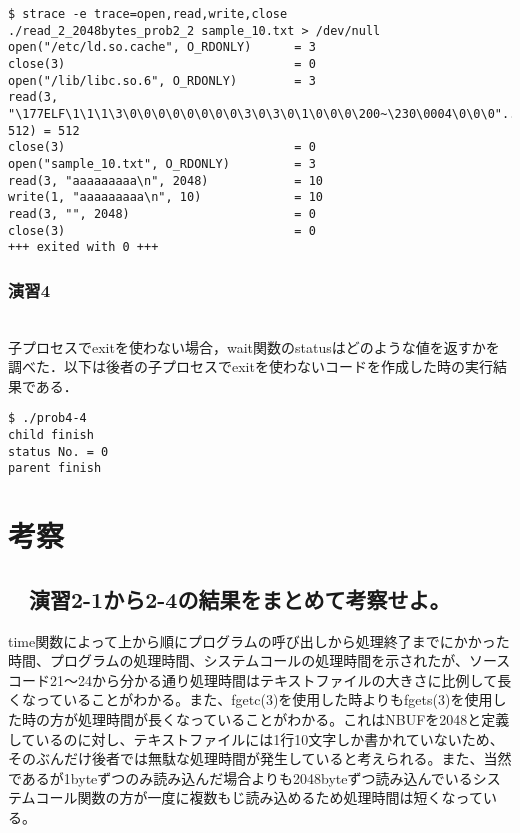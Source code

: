 \documentclass[a4paper,12pt]{jsarticle}
\begin{document}
\begin{lstlisting}[basicstyle=\footnotesize, caption={strace\_read\_2\_2048byte\_prob2\_2}, label=strace2048]
$ strace -e trace=open,read,write,close 
./read_2_2048bytes_prob2_2 sample_10.txt > /dev/null 
open("/etc/ld.so.cache", O_RDONLY)      = 3
close(3)                                = 0
open("/lib/libc.so.6", O_RDONLY)        = 3
read(3, "\177ELF\1\1\1\3\0\0\0\0\0\0\0\0\3\0\3\0\1\0\0\0\200~\230\0004\0\0\0"..., 512) = 512
close(3)                                = 0
open("sample_10.txt", O_RDONLY)         = 3
read(3, "aaaaaaaaa\n", 2048)            = 10
write(1, "aaaaaaaaa\n", 10)             = 10
read(3, "", 2048)                       = 0
close(3)                                = 0
+++ exited with 0 +++
\end{lstlisting}


\subsubsection{演習4}
\\
子プロセスでexitを使わない場合，wait関数のstatusはどのような値を返すかを調べた．以下は後者の子プロセスでexitを使わないコードを作成した時の実行結果である．
\begin{lstlisting}[basicstyle=\footnotesize, caption={prob4-4}, label=waitparent]
$ ./prob4-4
child finish
status No. = 0
parent finish
\end{lstlisting}

\section{考察}
\subsection*{　演習2-1から2-4の結果をまとめて考察せよ。}
time関数によって上から順にプログラムの呼び出しから処理終了までにかかった時間、プログラムの処理時間、システムコールの処理時間を示されたが、ソースコード21〜24から分かる通り処理時間はテキストファイルの大きさに比例して長くなっていることがわかる。また、fgetc(3)を使用した時よりもfgets(3)を使用した時の方が処理時間が長くなっていることがわかる。これはNBUFを2048と定義しているのに対し、テキストファイルには1行10文字しか書かれていないため、そのぶんだけ後者では無駄な処理時間が発生していると考えられる。また、当然であるが1byteずつのみ読み込んだ場合よりも2048byteずつ読み込んでいるシステムコール関数の方が一度に複数もじ読み込めるため処理時間は短くなっている。
\end{document}
